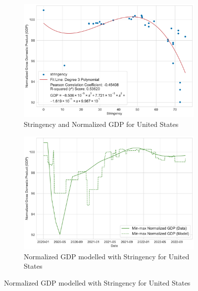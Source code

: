 \documentclass[tikz,fleqn,12pt]{wlscirep}
\begin{document}
\begin{figure}[htbp!]
  \centering
  \caption{Stringency and GDP for Advanced Economies}
  \begin{subfigure}[t]{0.48\textwidth}
    \centering
    \includegraphics[width=\linewidth]{images/stringency_vs_gdp_USA.pdf}
    \caption{Stringency and Normalized GDP for United States}
  \end{subfigure}
  \label{fig:stringency_vs_gdp_USA}
  \hfill
  \begin{subfigure}[t]{0.48\textwidth}
    \centering
    \includegraphics[width=\linewidth]{images/gdp_modelled_with_stringency_USA.pdf}
    \caption{Normalized GDP modelled with Stringency for United States}
  \end{subfigure}
  \label{fig:gdp_modelled_with_stringency_USA}


\end{figure}
\end{document}

